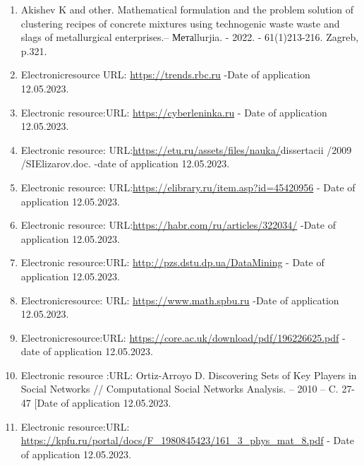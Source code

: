 \begin{enumerate}
\item
Akishev K and other. Mathematical formulation and the problem
solution of clustering recipes of concrete mixtures using technogenic
waste waste and slags of metallurgical enterprises.-- Метаllurjia. -
2022. - 61(1)213-216. Zagreb, p.321.

\item
Electronicresource URL: \href{https://trends.rbc.ru/trends/amp/news/61b359739a7947c7376ef7ce/}{https://trends.rbc.ru} -Date of application 12.05.2023.

\item
Electronic resource:URL: \href{https://cyberleninka.ru/article/n/analiz-i-klassifikatsiya-algoritmov-klasterizatsii}{https://cyberleninka.ru} - Date of application 12.05.2023.

\item
Electronic resource: URL:\url{https://etu.ru/assets/files/nauka/}dissertacii /2009
/SIElizarov.doc. -date of application 12.05.2023.

\item
Electronic resource: URL:\url{https://elibrary.ru/item.asp?id=45420956} - Date of application
12.05.2023.

\item
Electronic resource: URL:\url{https://habr.com/ru/articles/322034/} -Date of application 12.05.2023.

\item
Electronic resource:URL:
\href{http://pzs.dstu.dp.ua/DataMining/cluster/bibl/\%25D0\%9A\%D0\%9B\%D0\%90\%D0\%A1\%D0\%A2\%D0\%95\%D0\%A0\%D0\%98\%D0\%97\%D0\%90\%D0\%A6\%D0\%98\%D0\%AF\%20\%D0\%9E\%D0\%91\%D0\%AA\%D0\%95\%D0\%9A\%D0\%A2\%D0\%9E\%D0\%92\%20\%D0\%A1\%20\%D0\%9F\%D0\%9E\%D0\%9C\%D0\%9E\%D0\%A9\%D0\%AC\%D0\%AE\%20\%D0\%90\%D0\%9B\%D0\%93\%D0\%9E\%D0\%A0\%D0\%98\%D0\%A2\%D0\%9C\%D0\%90\%20DBSCAN.pdf}{http://pzs.dstu.dp.ua/DataMining}
- Date of application 12.05.2023.

\item
Electronicresource: URL: \href{https://www.math.spbu.ru/SD_AIS/documents/2014-05-341/2014-05-tw11.pdf}{https://www.math.spbu.ru}
-Date of application 12.05.2023.

\item
Electronicresource:URL: \url{https://core.ac.uk/download/pdf/196226625.pdf} - date of
application 12.05.2023.

\item
Electronic resource :URL: Ortiz-Arroyo D. Discovering Sets of Key
Players in Social Networks // Computational Social Networks Analysis. --
2010 -- C. 27-47 {[}Date of application 12.05.2023.

\item
Electronic resource:URL:
\href{https://kpfu.ru/portal/docs/F_1980845423/161_3\%20_phys\%20_mat_8.pdf}{https://kpfu.ru/portal/docs/F\_1980845423/161\_3\_phys\_mat\_8.pdf} - Date of application 12.05.2023.
\end{enumerate}

